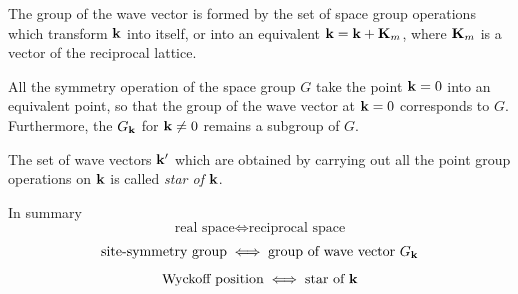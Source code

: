 \documentclass[a4paper,12pt]{report}
\begin{document}
\n

The group of the wave vector is formed by the set of space group operations which transform ${\vb{k}}$ into itself, or into an equivalent ${\vb{k}} = {\vb{k}} + {\vb{K}}_m$, where ${\vb{K}}_m$ is a vector of the reciprocal lattice.

All the symmetry operation of the space group $G$ take the point ${\vb{k}} = 0$ into an equivalent point, so that the group of the wave vector at ${\vb{k}} = 0$ corresponds to $G$. Furthermore, the $G_{\vb{k}}$ for ${\vb{k}} \neq 0$ remains a subgroup of $G$.

\n

The set of wave vectors ${\vb{k}}'$ which are obtained by carrying out all the point group operations on ${\vb{k}}$ is called \textit{star of} ${\vb{k}}$.

\n

In summary
$$
\text{real space} \iff \text{reciprocal space}
$$
$$
\text{site-symmetry group} \iff \text{group of wave vector }G_{\vb{k}}
$$
$$
\text{Wyckoff position} \iff \text{star of }{\vb{k}}
$$




%


\end{document}

